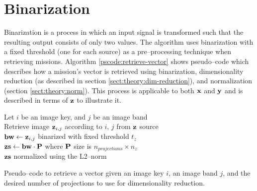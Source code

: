 \section{Binarization} \label{sect:meth:binarization}

Binarization is a process in which an input signal is transformed such that the resulting output consists of only two values. The \mlblink algorithm uses binarization with a fixed threshold (one for each source) as a pre--processing technique when retrieving missions. Algorithm \ref{pscode:retrieve-vector} shows pseudo--code which describes how a mission's vector is retrieved using binarization, dimensionality reduction (as described in section \ref{sect:theory:dim-reduction}), and normalization (section \ref{sect:theory:norm}). This process is applicable to both $\boldsymbol{\mathbf{x}}$ and $\boldsymbol{\mathbf{y}}$ and is described in terms of $\boldsymbol{\mathbf{z}}$ to illustrate it.

\vspace{0.4cm}
\begin{algorithm}[H]
    \SetAlgoLined
         {
            Let $i$ be an image key, and $j$ be an image band \\
            Retrieve image $\boldsymbol{\mathbf{z}}_{i,j}$ according to $i$, $j$ from $\boldsymbol{\mathbf{z}}$ source \\
            $\boldsymbol{\mathbf{bw}} \gets \boldsymbol{\mathbf{z}}_{i,j}$ binarized with fixed threshold $t_z$ \\
            $\boldsymbol{\mathbf{zs}} \gets \boldsymbol{\mathbf{bw}} \cdot \boldsymbol{\mathbf{P}}$ where $\boldsymbol{\mathbf{P}}$ size is $n_{projections} \times n_z$ \\
            \Return $\boldsymbol{\mathbf{zs}}$ normalized using the L2--norm
        }
    \caption{Pseudo--code to retrieve a vector given an image key $i$, an image band $j$, and the desired number of projections to use for dimensionality reduction.}
    \label{pscode:retrieve-vector}
\end{algorithm}
\vspace{0.4cm}